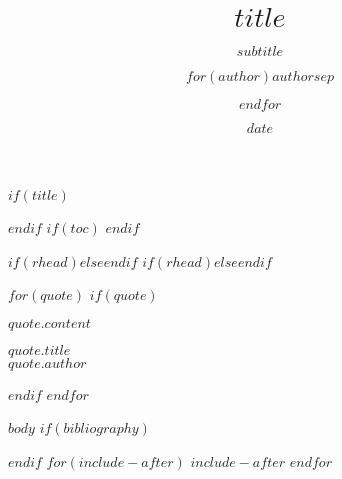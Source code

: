 \documentclass[$if(papersize)$$papersize$,$endif$nols, notitlepage, notoc]{tufte-handout}
\title{$title$}
\subtitle{$subtitle$}
\author{$for(author)$$author$$sep$ \and $endfor$}
\date{$date$}
\renewcommand\textsc[1]{{\smallcapsfont \uppercase{#1}}}
\newlength{\fullwidthlength}
\begin{document}
$if(title)$
\noindent
\begin{minipage}{\fullwidthlength}
\maketitle
\end{minipage} 
$endif$
$if(toc)$
{
\hypersetup{linkcolor=blue}
\setcounter{tocdepth}{$toc-depth$}
\tableofcontents
}
$endif$

\setlength{\epigraphwidth}{1.15\textwidth}
\pagestyle{fancy}
$if(rhead)$$else$\rhead{\footnotesize \thepage\ | \pageref{LastPage}}$endif$
{
  \fancyhf{}
  $if(rhead)$$else$\rhead{\footnotesize \thepage\ | \pageref{LastPage}}$endif$
  \renewcommand{\headrulewidth}{0pt}
}
\thispagestyle{firststyle}

$for(quote)$
$if(quote)$
\bigskip
\epigraph{$quote.content$}{$quote.title$\\\textsc{$quote.author$}}
\smallskip
$endif$
$endfor$

$body$
$if(bibliography)$

$endif$
$for(include-after)$
$include-after$
$endfor$
\end{document}
